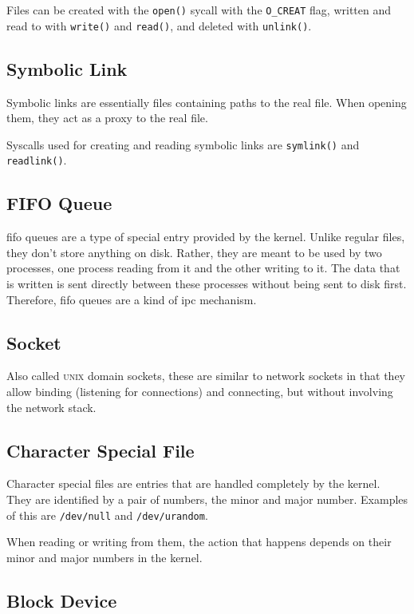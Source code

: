 \documentclass[a4paper]{article}
\begin{document}
Files can be created with the \verb|open()| sycall with the \verb|O_CREAT| flag, written and read to with \verb|write()| and \verb|read()|, and deleted with \verb|unlink()|.

\subsection{Symbolic Link}

Symbolic links are essentially files containing paths to the real file. When opening them, they act as a proxy to the real file. 

Syscalls used for creating and reading symbolic links are \verb|symlink()| and \verb|readlink()|.

\subsection{FIFO Queue}

\gls{fifo} queues are a type of special entry provided by the kernel. Unlike regular files, they don't store anything on disk. Rather, they are meant to be used by two processes, one process reading from it and the other writing to it. The data that is written is sent directly between these processes without being sent to disk first. Therefore, \gls{fifo} queues are a kind of \gls{ipc} mechanism.

\subsection{Socket}

Also called \textsc{unix} domain sockets, these are similar to network sockets in that they allow binding (listening for connections) and connecting, but without involving the network stack.

\subsection{Character Special File}

Character special files are entries that are handled completely by the kernel. They are identified by a pair of numbers, the minor and major number. Examples of this are \verb|/dev/null| and \verb|/dev/urandom|.

When reading or writing from them, the action that happens depends on their minor and major numbers in the kernel.

\subsection{Block Device}
\end{document}
